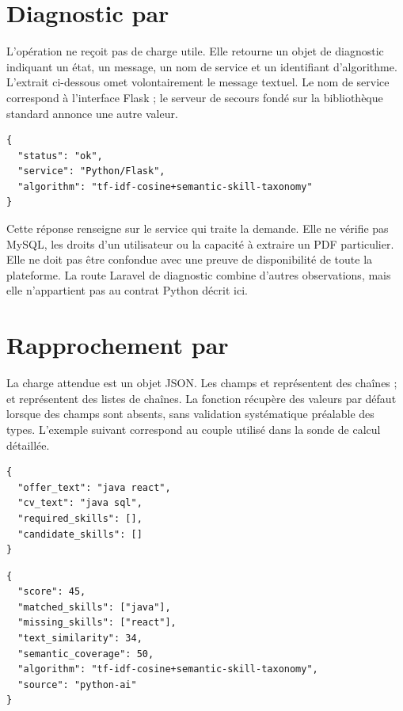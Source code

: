 \section{Diagnostic par }

L'opération ne reçoit pas de charge utile. Elle retourne un objet de diagnostic indiquant un état, un message, un nom de service et un identifiant d'algorithme. L'extrait ci-dessous omet volontairement le message textuel. Le nom de service correspond à l'interface Flask ; le serveur de secours fondé sur la bibliothèque standard annonce une autre valeur.

\begin{lstlisting}[caption={Extrait structurel du diagnostic Flask}]
{
  "status": "ok",
  "service": "Python/Flask",
  "algorithm": "tf-idf-cosine+semantic-skill-taxonomy"
}
\end{lstlisting}

Cette réponse renseigne sur le service qui traite la demande. Elle ne vérifie pas MySQL, les droits d'un utilisateur ou la capacité à extraire un PDF particulier. Elle ne doit pas être confondue avec une preuve de disponibilité de toute la plateforme. La route Laravel de diagnostic combine d'autres observations, mais elle n'appartient pas au contrat Python décrit ici.

\section{Rapprochement par }

La charge attendue est un objet JSON. Les champs  et  représentent des chaînes ;  et  représentent des listes de chaînes. La fonction récupère des valeurs par défaut lorsque des champs sont absents, sans validation systématique préalable des types. L'exemple suivant correspond au couple utilisé dans la sonde de calcul détaillée.

\begin{lstlisting}[caption={Requête synthétique de rapprochement}]
{
  "offer_text": "java react",
  "cv_text": "java sql",
  "required_skills": [],
  "candidate_skills": []
}
\end{lstlisting}

\begin{lstlisting}[caption={Résultat Python enregistré pour ce couple}]
{
  "score": 45,
  "matched_skills": ["java"],
  "missing_skills": ["react"],
  "text_similarity": 34,
  "semantic_coverage": 50,
  "algorithm": "tf-idf-cosine+semantic-skill-taxonomy",
  "source": "python-ai"
}
\end{lstlisting}

